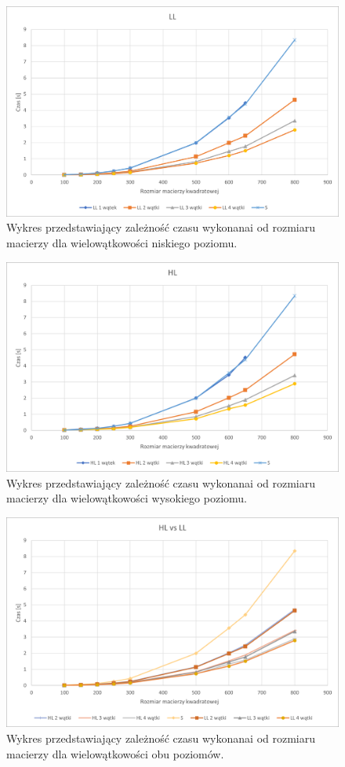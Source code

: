 \documentclass{report}
\begin{document}
\begin{figure}[H]%
	\centering
	\includegraphics[scale=0.7]{zdj/LL}
	\caption{Wykres przedstawiający zależność czasu wykonanai od rozmiaru macierzy dla wielowątkowości niskiego poziomu.}
\end{figure}

\begin{figure}[H]%
	\centering
	\includegraphics[scale=0.7]{zdj/HL}
	\caption{Wykres przedstawiający zależność czasu wykonanai od rozmiaru macierzy dla wielowątkowości wysokiego poziomu.}
\end{figure}

\begin{figure}[H]%
	\centering
	\includegraphics[scale=0.7]{zdj/both}
	\caption{Wykres przedstawiający zależność czasu wykonanai od rozmiaru macierzy dla wielowątkowości obu poziomów.}
\end{figure}
\end{document}
